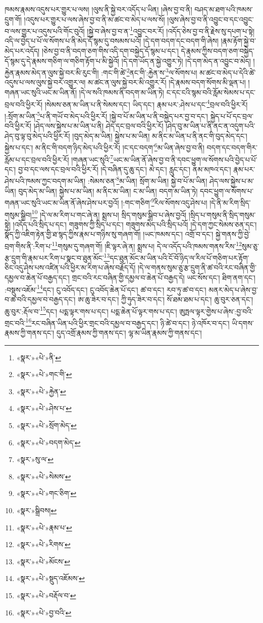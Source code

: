 ཁམས་རྣམས་འདུས་པར་གྱུར་པ་ལས། །ལུས་ནི་སྐྱེ་བར་འདོད་པ་ཡིན། །ཞེས་བྱ་བ་ནི། བཤད་མ་ཐག་པའི་ཁམས་དྲུག་གོ། །འདུས་པར་གྱུར་པ་ལས་ཞེས་བྱ་བ་ནི་མ་ཚང་བ་མེད་པ་ལས་སོ། །ལུས་ཞེས་བྱ་བ་ནི་འབྱུང་བ་དང་འབྱུང་བ་ལས་གྱུར་པ་འདུས་པའི་གོང་བུའོ། །སྐྱེ་བ་ཞེས་བྱ་བ་ན་\footnote{«སྣར་»«པེ་»ནི་}འབྱུང་བར་རོ། །འདོད་ཅེས་བྱ་བ་ནི་རྗེས་སུ་དཔག་པ་སྟེ། འདི་ལ་བྱེད་པ་པོ་ལ་སོགས་པ་ནི་མེད་དོ་སྙམ་དུ་བསམས་པའོ། །དེ་དག་བདག་དང་བདག་གི་ཞེས། །རྣམ་རྟོག་སྐྱེ་བ་མེད་པར་འདོད། །ཅེས་བྱ་བ་ནི་བདག་ཅག་གིས་འདི་དག་བསྐྱེད་དོ་སྙམ་པ་དང་། དེ་རྣམས་ཀྱིས་བདག་ཅག་བསྐྱེད་དོ་སྙམ་དུ་དེ་རྣམས་གཅིག་ལ་གཅིག་རྟོག་པ་མི་སྐྱེའོ། །དེ་དག་ཡོད་ན་སྐྱེ་འགྱུར་ཏེ། །དེ་དག་མེད་ན་འབྱུང་བ་མེད། །རྐྱེན་རྣམས་མེད་ན་ལུས་སྐྱེ་བར་མི་རུང་གི། :གང་གི་ཚེ་\footnote{«སྣར་»«པེ་»གང་གི་}ནང་གི་:རྐྱེན་ས་\footnote{«སྣར་»«པེ་»རྐྱེན་}ལ་སོགས་པ། མ་ཚང་བ་མེད་པ་དེའི་ཚེ་འདུས་པ་ལས་ལུས་སྐྱེ་བར་འགྱུར་ལ། མ་ཚང་ན་ལུས་སྐྱེ་བར་མི་འགྱུར་རོ། །དེ་རྣམས་བདག་སོགས་མི་ལྡན་པ། །གཞན་ཡང་སུའི་ཡང་མ་ཡིན་ནོ། །དེ་ལ་སའི་ཁམས་ནི་བདག་མ་ཡིན་ཏེ། ང་དང་ངའི་སྙམ་བའི་རློམ་སེམས་པ་དང་བྲལ་བའི་ཕྱིར་རོ། །སེམས་ཅན་མ་ཡིན་པ་ནི་སེམས་དང་། ཡིད་དང་། རྣམ་པར་:ཤེས་པ་དང་\footnote{«སྣར་»«པེ་»ཤེས་པ་}བྲལ་བའི་ཕྱིར་རོ། །:སྲོག་མ་ཡིན་\footnote{«སྣར་»«པེ་»སྲོག་མེད་}པ་ནི་གཡོ་བ་མེད་པའི་ཕྱིར་རོ། །སྐྱེ་བ་པོ་མ་ཡིན་པ་ནི་བསྐྱེད་པར་བྱ་བ་དང་། སྐྱེད་པ་པོ་དང་བྲལ་བའི་ཕྱིར་རོ། །ཤེད་ལས་སྐྱེས་པ་མ་ཡིན་པ་ནི། ཤེད་དང་བྲལ་བའི་ཕྱིར་རོ། །ཤེད་བུ་མ་ཡིན་པ་ནི་ནང་ན་འདུག་པའི་ཤེད་བུ་ལྟ་བུ་མེད་པའི་ཕྱིར་རོ། །བུད་མེད་མ་ཡིན། སྐྱེས་པ་མ་ཡིན། མ་ནིང་མ་ཡིན་པ་ནི་ནང་གི་བུད་མེད་དང་། སྐྱེས་པ་དང་། མ་ནིང་གི་བདག་ཉིད་མེད་པའི་ཕྱིར་རོ། །ང་དང་བདག་\footnote{«སྣར་»«པེ་»བདག་མེད་}མ་ཡིན་ཞེས་བྱ་བ་ནི། བདག་དང་བདག་གིར་རློམ་པ་དང་བྲལ་བའི་ཕྱིར་རོ། །གཞན་ཡང་སུའི་\footnote{«སྣར་»སུ་ལ་}ཡང་མ་ཡིན་ནོ་ཞེས་བྱ་བ་ནི་དབང་ཕྱུག་ལ་སོགས་པའི་བྱེད་པ་པོ་དང་། བྱ་བ་དང་ལས་དང་བྲལ་བའི་ཕྱིར་རོ། །དེ་བཞིན་དུ་ཆུ་དང་། མེ་དང་། རླུང་དང་། ནམ་མཁའ་དང་། རྣམ་པར་ཤེས་པའི་ཁམས་ཀྱང་བདག་མ་ཡིན། :སེམས་ཅན་\footnote{«སྣར་»«པེ་»སེམས་}མ་ཡིན། སྲོག་མ་ཡིན། སྐྱེ་བ་པོ་མ་ཡིན། ཤེད་ལས་སྐྱེས་པ་མ་ཡིན། བུད་མེད་མ་ཡིན། སྐྱེས་པ་མ་ཡིན། མ་ནིང་མ་ཡིན། ང་མ་ཡིན། བདག་མ་ཡིན་ཏེ། དབང་ཕྱུག་ལ་སོགས་པ་གཞན་ཡང་སུའི་ཡང་མ་ཡིན་ནོ་ཞེས་ཤེས་པར་བྱའོ། །:གང་གཅིག་\footnote{«སྣར་»«པེ་»གང་ཅིག་}རིལ་སོགས་འདུ་ཤེས་པ། །དེ་ནི་མ་རིག་སྲིད་གསུམ་སྒྲིབ།\footnote{«སྣར་»སྒྲིབས།} །དེ་ལ་མ་རིག་པ་གང་ཞེ་ན། སྨྲས་པ། སྲིད་གསུམ་སྒྲིབ་པ་ཞེས་བྱའོ། །སྲིད་པ་གསུམ་ནི་སྲིད་གསུམ་སྟེ། །འདོད་པའི་སྲིད་པ་དང་། གཟུགས་ཀྱི་སྲིད་པ་དང་། གཟུགས་མེད་པའི་སྲིད་པའོ། །དེ་དག་ཀྱང་སེམས་ཅན་དང་། སྣོད་ཀྱི་འཇིག་རྟེན་གྱི་ཐ་སྙད་ཀྱིས་རྣམ་པ་གཉིས་སུ་གཞག་གོ། །ཡང་ཁམས་དང་། འགྲོ་བ་དང་། སྐྱེ་གནས་ཀྱི་བྱེ་བྲག་གིས་ནི་:རིག་པ་\footnote{«སྣར་»«པེ་»རྣམ་པ་}གསུམ་དུ་གཞག་གོ། །ཇི་ལྟར་ཞེ་ན། སྨྲས་པ། དེ་ལ་འདོད་པའི་ཁམས་གནས་རིས་\footnote{«སྣར་»«པེ་»རིགས་}སུམ་ཅུ་རྩ་དྲུག་གི་རྣམ་པར་རིག་པ་སྣང་བ་ཐུན་མོང་\footnote{«སྣར་»«པེ་»མོངས་}དང་ཐུན་མོང་མ་ཡིན་པའི་ངོ་བོ་ཉིད་ལ་རིལ་པོ་གཅིག་པར་རྟོག་ཅིང་འདུ་ཤེས་པས་འཛིན་པའི་ཕྱིར་མ་རིག་པ་ཞེས་བརྗོད་དོ། །དེ་ལ་གནས་སུམ་ཅུ་རྩ་དྲུག་ནི་ཚ་བའི་རང་བཞིན་གྱི་དམྱལ་བ་ཆེན་པོ་བརྒྱད་དང་། གྲང་བའི་རང་བཞིན་གྱི་དམྱལ་བ་ཆེན་པོ་བརྒྱད་དེ། ཡང་སོས་དང་། ཐིག་ནག་དང་། :བསྡུས་འཇོམ་\footnote{«སྣར་»«པེ་»སྡུད་འཇོམས་}དང་། ངུ་འབོད་དང་། ངུ་འབོད་ཆེན་པོ་དང་། ཚ་བ་དང་། རབ་ཏུ་ཚ་བ་དང་། མནར་མེད་པ་ཞེས་བྱ་བ་ཚ་བའི་དམྱལ་བ་བརྒྱད་དང་། ཨ་ཆུ་ཟེར་བ་དང་། ཀྱི་ཧུད་ཟེར་བ་དང་། སོ་ཐམ་ཐམ་པ་དང་། ཆུ་བུར་ཅན་དང་། ཆུ་བུར་:རྡོལ་བ་\footnote{«སྣར་»«པེ་»བརྡོལ་བ་}དང་། པདྨ་ལྟར་གས་པ་དང་། པདྨ་ཆེན་པོ་ལྟར་གས་པ་དང་། ཨུཏྤལ་ལྟར་གྱེས་པ་ཞེས་:བྱ་བའི་གྲང་བའི་\footnote{«སྣར་»«པེ་»བྱ་བའི་}རང་བཞིན་ཡིན་པའི་ཕྱིར་གྲང་བའི་དམྱལ་བ་བརྒྱད་དང་། ཉི་ཚེ་བ་དང་། ཉེ་འཁོར་བ་དང་། ཡི་དགས་རྣམས་ཀྱི་གནས་དང་། དུད་འགྲོ་རྣམས་ཀྱི་གནས་དང་། ལྷ་མ་ཡིན་རྣམས་ཀྱི་གནས་དང་། 